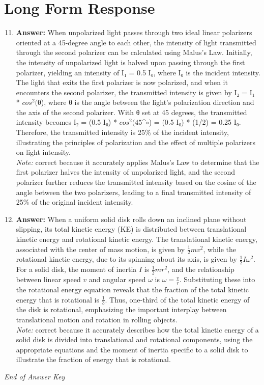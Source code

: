 \documentclass[12pt]{article}
\begin{document}
\section*{Long Form Response}
\begin{enumerate}[label=\arabic*.]
\setcounter{enumi}{10}
\item \textbf{Answer:} When unpolarized light passes through two ideal linear polarizers oriented at a 45-degree angle to each other, the intensity of light transmitted through the second polarizer can be calculated using Malus's Law. Initially, the intensity of unpolarized light is halved upon passing through the first polarizer, yielding an intensity of I₁ = 0.5 I₀, where I₀ is the incident intensity. The light that exits the first polarizer is now polarized, and when it encounters the second polarizer, the transmitted intensity is given by I₂ = I₁ * $cos^2($θ), where θ is the angle between the light's polarization direction and the axis of the second polarizer. With θ set at 45 degrees, the transmitted intensity becomes I₂ = (0.5 I₀) * $cos^2(45$^\ensuremath{\circ}) = (0.5 I₀) * (1/2) = 0.25 I₀. Therefore, the transmitted intensity is 25\% of the incident intensity, illustrating the principles of polarization and the effect of multiple polarizers on light intensity.
\\ \textit{Note:} correct because it accurately applies Malus's Law to determine that the first polarizer halves the intensity of unpolarized light, and the second polarizer further reduces the transmitted intensity based on the cosine of the angle between the two polarizers, leading to a final transmitted intensity of 25\% of the original incident intensity.
\item \textbf{Answer:} When a uniform solid disk rolls down an inclined plane without slipping, its total kinetic energy (KE) is distributed between translational kinetic energy and rotational kinetic energy. The translational kinetic energy, associated with the center of mass motion, is given by \( \frac{1}{2} mv^2 \), while the rotational kinetic energy, due to its spinning about its axis, is given by \( \frac{1}{2} I \omega^2 \). For a solid disk, the moment of inertia \( I \) is \( \frac{1}{2} m r^2 \), and the relationship between linear speed \( v \) and angular speed \( \omega \) is \( \omega = \frac{v}{r} \). Substituting these into the rotational energy equation reveals that the fraction of the total kinetic energy that is rotational is \( \frac{1}{3} \). Thus, one-third of the total kinetic energy of the disk is rotational, emphasizing the important interplay between translational motion and rotation in rolling objects.
\\ \textit{Note:} correct because it accurately describes how the total kinetic energy of a solid disk is divided into translational and rotational components, using the appropriate equations and the moment of inertia specific to a solid disk to illustrate the fraction of energy that is rotational.
\end{enumerate}

\vfill
\noindent\textit{End of Answer Key}
\end{document}
